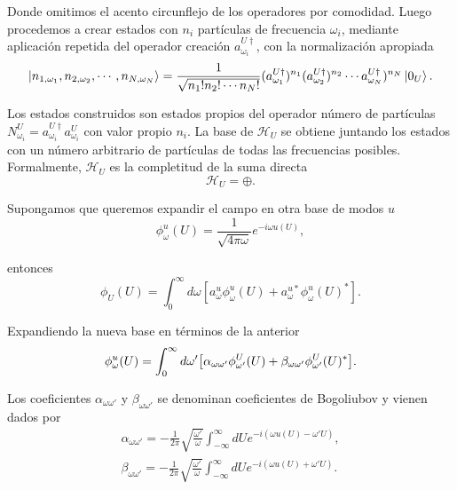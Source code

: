 Donde omitimos el acento circunflejo de los operadores por comodidad.
Luego procedemos a crear estados con $n_i$ partículas de frecuencia $\omega_i$, mediante
aplicación repetida del operador creación $a_{\omega_i}^{U\dagger}$, con la normalización apropiada
\begin{equation}
  \ket{n_{1,\omega_1}, n_{2,\omega_2},\cdots,n_{N,\omega_N}} = \frac{1}{\sqrt{n_1!n_2!\cdots n_N!}}(a_{\omega_1}^{U\dagger})^{n_1}
  (a_{\omega_2}^{U\dagger})^{n_2}\cdots a_{\omega_N}^{U\dagger})^{n_N} \ket{0_U}.
\end{equation}

Los estados construidos son estados propios del operador número de partículas $N_{\omega_i}^U=a_{\omega_i}^{U\dagger}a_{\omega_i}^U$
con valor propio $n_i$.
La base de $\mathcal H_U$ se obtiene juntando los estados con un número arbitrario de partículas
de todas las frecuencias posibles.
Formalmente, $\mathcal H_U$ es la completitud de la suma directa 
\begin{equation}
  \mathcal H_U = \oplus  .
\end{equation}

Supongamos que queremos expandir el campo en otra base de modos $u$
\begin{equation}
  \phi_\omega^u(U)=\frac{1}{\sqrt{4\pi\omega}}e^{-i\omega u(U)}, 
\end{equation}

entonces
\begin{equation}
  \phi_U(U) = \int_0^\infty d\omega [a_\omega^u \phi^u_\omega(U) +  a_\omega^{u*} \phi_\omega^u(U)^*].
\end{equation}

Expandiendo la nueva base en términos de la anterior
\begin{equation}
  \phi_\omega^u(U) = \int_0^\infty d\omega'\qty[ \alpha_{\omega\omega'} \phi_{\omega'}^U(U) 
  +\beta_{\omega\omega'} \phi_{\omega'}^U(U)^*].
\end{equation}

Los coeficientes $\alpha_{\omega\omega'}$ y $\beta_{\omega\omega'}$ se denominan coeficientes
de Bogoliubov y vienen dados por
\begin{gather}
  \alpha_{\omega\omega'} = -\frac{1}{2\pi}\sqrt{\frac{\omega'}{\omega}}\int_{-\infty}^\infty dU e^{-i(\omega u(U) -\omega' U)},\\
  \beta_{\omega\omega'} = -\frac{1}{2\pi}\sqrt{\frac{\omega'}{\omega}}\int_{-\infty}^\infty dU e^{-i(\omega u(U) +\omega' U)}.
\end{gather}

